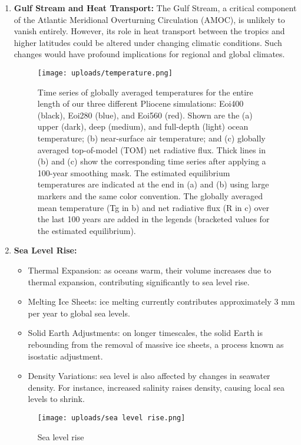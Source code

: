 \begin{enumerate}
	\item \textbf{Gulf Stream and Heat Transport:} The Gulf Stream, a critical component of the Atlantic Meridional Overturning Circulation (AMOC), is unlikely to vanish entirely. However, its role in heat transport between the tropics and higher latitudes could be altered under changing climatic conditions. Such changes would have profound implications for regional and global climates.
	      \begin{figure}[htpb]
		      \centering
		      \texttt{[image: uploads/temperature.png]}
		      \caption{Time series of globally averaged temperatures for the entire length of our three different Pliocene simulations: Eoi400 (black), Eoi280 (blue), and Eoi560 (red). Shown are the (a) upper (dark), deep (medium), and full-depth (light) ocean temperature; (b) near-surface air temperature; and (c) globally averaged top-of-model (TOM) net radiative flux. Thick lines in (b) and (c) show the corresponding time series after applying a 100-year smoothing mask. The estimated equilibrium temperatures are indicated at the end in (a) and (b) using large markers and the same color convention. The globally averaged mean temperature (Tg in b) and net radiative flux (R in c) over the last 100 years are added in the legends (bracketed values for the estimated equilibrium). }
		      \label{fig:temperature}
	      \end{figure}
	\item \textbf{Sea Level Rise:}
	      \begin{itemize}
		      \item Thermal Expansion: as oceans warm, their volume increases due to thermal expansion, contributing significantly to sea level rise.
		      \item Melting Ice Sheets: ice melting currently contributes approximately 3 mm per year to global sea levels.
		      \item Solid Earth Adjustments: on longer timescales, the solid Earth is rebounding from the removal of massive ice sheets, a process known as isostatic adjustment.
		      \item Density Variations: sea level is also affected by changes in seawater density. For instance, increased salinity raises density, causing local sea levels to shrink.
	      \end{itemize}
	      \begin{figure}[htpb]
		      \centering
		      \texttt{[image: uploads/sea level rise.png]}
		      \caption{Sea level rise}
		      \label{fig:sea level rise}
	      \end{figure}








\end{enumerate}
